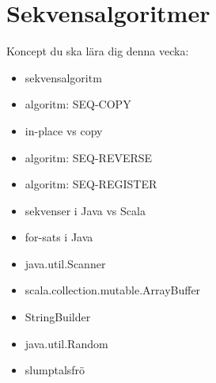 \chapter{Sekvensalgoritmer}\label{chapter:W05}
Koncept du ska lära dig denna vecka:
\begin{multicols}{2}\begin{itemize}[nosep,label={$\square$},leftmargin=*]
\item sekvensalgoritm
\item algoritm: SEQ-COPY
\item in-place vs copy
\item algoritm: SEQ-REVERSE
\item algoritm: SEQ-REGISTER
\item sekvenser i Java vs Scala
\item for-sats i Java
\item java.util.Scanner
\item scala.collection.mutable.ArrayBuffer
\item StringBuilder
\item java.util.Random
\item slumptalsfrö\end{itemize}\end{multicols}
